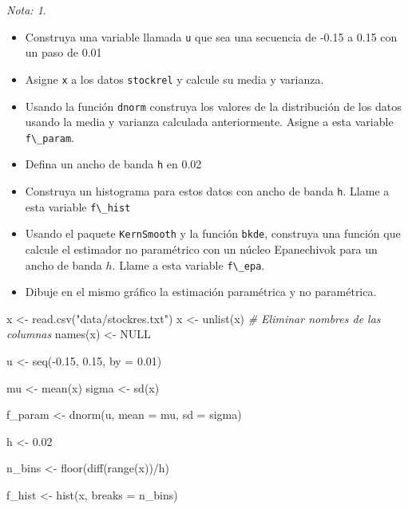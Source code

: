 \documentclass[
  12pt,
]{book}
\newenvironment{Shaded}{\begin{snugshade}}{\end{snugshade}}
\newcommand{\AttributeTok}[1]{\textcolor[rgb]{0.77,0.63,0.00}{#1}}
\newcommand{\CommentTok}[1]{\textcolor[rgb]{0.56,0.35,0.01}{\textit{#1}}}
\newcommand{\ConstantTok}[1]{\textcolor[rgb]{0.00,0.00,0.00}{#1}}
\newcommand{\FloatTok}[1]{\textcolor[rgb]{0.00,0.00,0.81}{#1}}
\newcommand{\FunctionTok}[1]{\textcolor[rgb]{0.00,0.00,0.00}{#1}}
\newcommand{\NormalTok}[1]{#1}
\newcommand{\OtherTok}[1]{\textcolor[rgb]{0.56,0.35,0.01}{#1}}
\newcommand{\SpecialCharTok}[1]{\textcolor[rgb]{0.00,0.00,0.00}{#1}}
\newcommand{\StringTok}[1]{\textcolor[rgb]{0.31,0.60,0.02}{#1}}
\providecommand{\tightlist}{%
  \setlength{\itemsep}{0pt}\setlength{\parskip}{0pt}}
\theoremstyle{definition}
\theoremstyle{definition}
\theoremstyle{definition}
\theoremstyle{definition}
\theoremstyle{remark}
\newtheorem*{remark}{Nota: }
\begin{document}
\begin{remark}

\begin{itemize}
\tightlist
\item
  Construya una variable llamada \texttt{u} que sea una secuencia de -0.15 a 0.15 con un paso de 0.01
\item
  Asigne \texttt{x} a los datos \texttt{stockrel} y calcule su media y varianza.
\item
  Usando la función \texttt{dnorm} construya los valores de la distribución de los datos usando la media y varianza calculada anteriormente. Asigne a esta variable \texttt{f\textbackslash{}\_param}.
\item
  Defina un ancho de banda \texttt{h} en 0.02
\item
  Construya un histograma para estos datos con ancho de banda \texttt{h}. Llame a esta variable \texttt{f\textbackslash{}\_hist}
\item
  Usando el paquete \texttt{KernSmooth} y la función \texttt{bkde}, construya una función que calcule el estimador no paramétrico con un núcleo Epanechivok para un ancho de banda \(h\). Llame a esta variable \texttt{f\textbackslash{}\_epa}.
\item
  Dibuje en el mismo gráfico la estimación paramétrica y no paramétrica.
\end{itemize}

\end{remark}

\begin{Shaded}
\begin{Highlighting}[]
\NormalTok{x }\OtherTok{\textless{}{-}} \FunctionTok{read.csv}\NormalTok{(}\StringTok{"data/stockres.txt"}\NormalTok{)}
\NormalTok{x }\OtherTok{\textless{}{-}} \FunctionTok{unlist}\NormalTok{(x)}
\CommentTok{\# Eliminar nombres de las columnas}
\FunctionTok{names}\NormalTok{(x) }\OtherTok{\textless{}{-}} \ConstantTok{NULL}

\NormalTok{u }\OtherTok{\textless{}{-}} \FunctionTok{seq}\NormalTok{(}\SpecialCharTok{{-}}\FloatTok{0.15}\NormalTok{, }\FloatTok{0.15}\NormalTok{, }\AttributeTok{by =} \FloatTok{0.01}\NormalTok{)}

\NormalTok{mu }\OtherTok{\textless{}{-}} \FunctionTok{mean}\NormalTok{(x)}
\NormalTok{sigma }\OtherTok{\textless{}{-}} \FunctionTok{sd}\NormalTok{(x)}

\NormalTok{f\_param }\OtherTok{\textless{}{-}} \FunctionTok{dnorm}\NormalTok{(u, }\AttributeTok{mean =}\NormalTok{ mu, }\AttributeTok{sd =}\NormalTok{ sigma)}

\NormalTok{h }\OtherTok{\textless{}{-}} \FloatTok{0.02}

\NormalTok{n\_bins }\OtherTok{\textless{}{-}} \FunctionTok{floor}\NormalTok{(}\FunctionTok{diff}\NormalTok{(}\FunctionTok{range}\NormalTok{(x))}\SpecialCharTok{/}\NormalTok{h)}

\NormalTok{f\_hist }\OtherTok{\textless{}{-}} \FunctionTok{hist}\NormalTok{(x, }\AttributeTok{breaks =}\NormalTok{ n\_bins)}
\end{Highlighting}
\end{Shaded}
\end{document}
